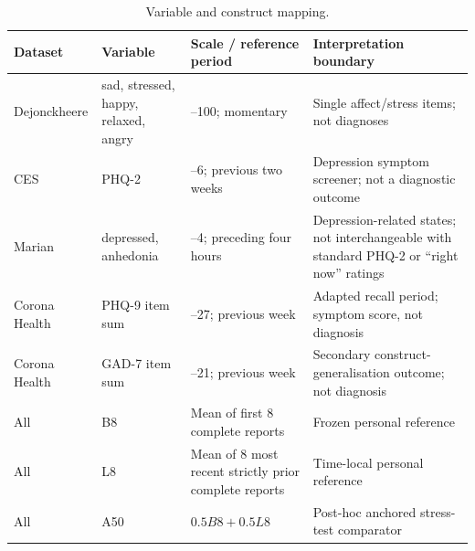 \documentclass[pdflatex,sn-vancouver-num]{sn-jnl}
\begin{document}
\begin{table}[!htbp]
\caption{Variable and construct mapping.}\label{tab:s2}
\centering\footnotesize
\begin{tabularx}{\textwidth}{@{}ll>{\raggedright\arraybackslash}X>{\raggedright\arraybackslash}X@{}}
\toprule
Dataset & Variable & Scale / reference period & Interpretation boundary\\
\midrule
Dejonckheere & sad, stressed, happy, relaxed, angry & 0--100; momentary & Single affect/stress items; not diagnoses\\
CES & PHQ-2 & 0--6; previous two weeks & Depression symptom screener; not a diagnostic outcome\\
Marian & depressed, anhedonia & 1--4; preceding four hours & Depression-related states; not interchangeable with standard PHQ-2 or ``right now'' ratings\\
Corona Health & PHQ-9 item sum & 0--27; previous week & Adapted recall period; symptom score, not diagnosis\\
Corona Health & GAD-7 item sum & 0--21; previous week & Secondary construct-generalisation outcome; not diagnosis\\
All & B8 & Mean of first 8 complete reports & Frozen personal reference\\
All & L8 & Mean of 8 most recent strictly prior complete reports & Time-local personal reference\\
All & A50 & $0.5B8+0.5L8$ & Post-hoc anchored stress-test comparator\\
\bottomrule
\end{tabularx}
\end{table}
\end{document}
